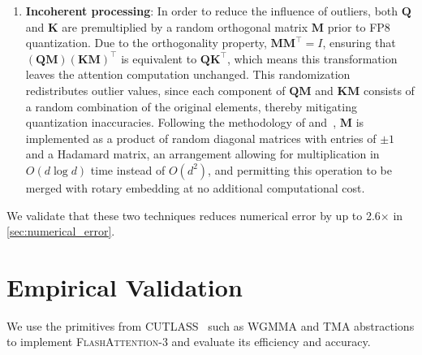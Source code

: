 \begin{algorithm}[H]
\begin{algorithmic}[1]
\begin{enumerate}
\item \textbf{Incoherent processing}: In order to reduce the influence of outliers, both $\mathbf{Q}$ and $\mathbf{K}$ are premultiplied by a random orthogonal matrix $\mathbf{M}$ prior to FP8 quantization. Due to the orthogonality property, $\mathbf{M} \mathbf{M}^\top = I$, ensuring that $(\mathbf{Q} \mathbf{M}) (\mathbf{K} \mathbf{M})^\top$ is equivalent to $\mathbf{Q} \mathbf{K}^\top$, which means this transformation leaves the attention computation unchanged. This randomization redistributes outlier values, since each component of $\mathbf{Q} \mathbf{M}$ and $\mathbf{K} \mathbf{M}$ consists of a random combination of the original elements, thereby mitigating quantization inaccuracies. Following the methodology of \citet{chee2024quip} and~\citet{tseng2024quip}, $\mathbf{M}$ is implemented as a product of random diagonal matrices with entries of $\pm 1$ and a Hadamard matrix, an arrangement allowing for multiplication in $O(d \log d)$ time instead of $O(d^2)$, and permitting this operation to be merged with rotary embedding at no additional computational cost.
\end{enumerate}

We validate that these two techniques reduces numerical error by up to 2.6$\times$ in \cref{sec:numerical_error}.

\section{Empirical Validation}
\label{sec:exp}

We use the primitives from CUTLASS~\citep{Thakkar_CUTLASS_2023} such as WGMMA and TMA abstractions to implement \textsc{FlashAttention-3} and evaluate its efficiency and accuracy.

\begin{itemize}


\end{itemize}
\end{algorithmic}
\end{algorithm}
